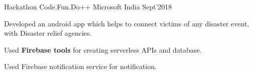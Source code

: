
\begin{cventries}
  \cventry
  {Hackathon}
  {Code.Fun.Do++}
  {Microsoft India}
  {Sept'2018}
  {
    \begin{cvitems}
    \item Developed an android app which helps to connect victims of any disaster event, with Disaster relief agencies.
    \item Used \textbf{Firebase tools} for creating serverless APIs and database.
    \item Used Firebase notification service for notification.
    \end{cvitems}
  }

\end{cventries}

